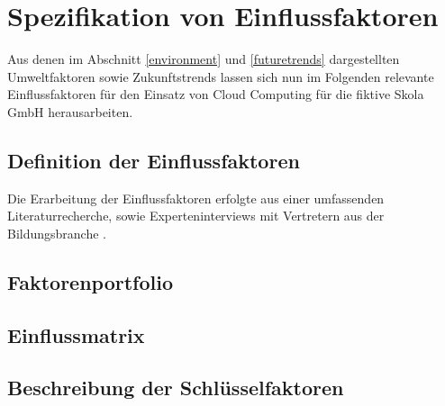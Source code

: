 \section{Spezifikation von Einflussfaktoren}
\label{influencingfactors}

Aus denen im Abschnitt \ref{environment} und \ref{futuretrends} dargestellten Umweltfaktoren sowie Zukunftstrends lassen sich nun im Folgenden relevante Einflussfaktoren für den Einsatz von Cloud Computing für die fiktive Skola GmbH herausarbeiten.

\subsection{Definition der Einflussfaktoren}

Die Erarbeitung der Einflussfaktoren erfolgte aus einer umfassenden Literaturrecherche, sowie Experteninterviews mit Vertretern aus der Bildungsbranche .

\subsection{Faktorenportfolio}

\subsection{Einflussmatrix}

\subsection{Beschreibung der Schlüsselfaktoren}